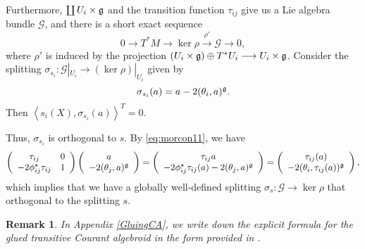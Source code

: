 \documentclass[letterpaper,10pt, oneside]{article} %
\newtheorem{rmk}[thm]{Remark}
\newcommand{\calc}[1]{} %
\newcommand{\ii}{\mathbbm i}
\newcommand{\huaG}{\mathcal{G}}
\def\qed{\hfill ~\vrule height6pt width6pt depth0pt}
\newcommand{\half}{\frac{1}{2}}
\newcommand{\pair}[1]{\left\langle #1\right\rangle}
\begin{document}
Furthermore, $\coprod U_i\times \mathfrak g$ and the transition function $\tau_{ij}$ give us a Lie algebra bundle $\huaG$, and there is a short exact sequence
$$
0\stackrel{}{\longrightarrow}T^*M\stackrel{}{\longrightarrow}\ker\rho\stackrel{\rho'}{\longrightarrow}\huaG\stackrel{}{\longrightarrow}0,
$$
where $\rho'$ is induced by the projection $ (U_i\times\mathfrak g)\oplus T^*U_i\longrightarrow U_i\times \mathfrak g$.
Consider the splitting $\sigma_{s_i}:\huaG|_{U_i}\longrightarrow (\ker\rho)|_{U_i}$ given by
\begin{equation}\label{eq:tcs2}
\sigma_{s_i}(a)=a-2(\theta_i,a)^\mathfrak g.
\end{equation}
Then $\pair{s_i(X),\sigma_{s_i}(a)}^T=0$.
\calc{
It is straightforward to obtain that
\begin{eqnarray*}
 \pair{s_i(X),\sigma_{s_i}(a)}^T&=& \pair{X+\theta_i(X)-(\theta_i,\theta_i(X))^\g-\ii_XB_i,a-2(\theta_i,a)^\g}^T\\
  &=&\half\Big(-2(\theta_i(X),a)^\g \Big)+(\theta_i(X),a)^\g\\
  &=&0.
\end{eqnarray*}}
Thus, $\sigma_{s_i}$ is orthogonal to $s$. By \eqref{eq:morcon11}, we have
$$
\left(\begin{array}{cc}
 \tau_{ij}&0\\
 -2\phi_{ij}^\star\tau_{ij} &1
\end{array}\right)\left(\begin{array}{c}
 a\\
 -2(\theta_j,a)^\mathfrak g
\end{array}\right)=\left(\begin{array}{c}
 \tau_{ij}a\\
 -2\phi_{ij}^\star\tau_{ij}(a)-2(\theta_j,a)^\mathfrak g
\end{array}\right)=\left(\begin{array}{c}
 \tau_{ij}(a)\\
 -2(\theta_i,\tau_{ij}(a))^\mathfrak g
\end{array}\right),
$$
which implies that we have a globally well-defined splitting $\sigma_{s}:\huaG\longrightarrow \ker\rho$ that orthogonal to the splitting $s$.\qed

\begin{rmk}
In Appendix \ref{GluingCA}, we write down the explicit formula for the glued transitive Courant algebroid in the form provided in \cite{ChenRCA}.
\end{rmk}
\end{document}

